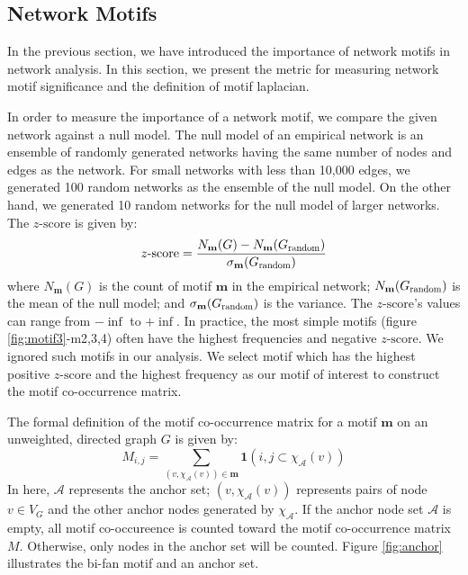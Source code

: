 \documentclass{article}
\theoremstyle{definition}
\begin{document}
\subsection{Network Motifs}

In the previous section, we have introduced the importance of
network motifs in network analysis. In this section, we present
the metric for measuring network motif significance and the definition
of motif laplacian.

In order to measure the importance of a network motif, we compare
the given network against a null model. The null model of an empirical network 
is an ensemble of randomly generated networks having the same number of nodes and
edges as the network. For small networks with less than 10,000 edges, we
generated 100 random networks as the ensemble of the null model. On the other
hand, we generated 10 random networks for the null model of larger networks.
The $z\mbox{-score}$ is given by:
\begin{equation*}
z\mbox{-score} = \frac{N_\mathbf{m}(G)-N_\mathbf{m}(G_{\scalebox{0.75}{random}})}{\sigma_\mathbf{m}(G_{\scalebox{0.75}{random}})}
\end{equation*}
where $N_\mathbf{m}(G)$ is the count of motif $\mathbf{m}$ in the empirical
network; $N_\mathbf{m}(G_{\scalebox{0.75}{random}})$ is the mean of the
null model; and $\sigma_\mathbf{m}(G_{\scalebox{0.75}{random}})$ is the variance.
The $z\mbox{-score}$'s values can range from $-\inf$ to $+\inf$. In practice,
the most simple motifs (figure \ref{fig:motif3}-m2,3,4) often have the highest
frequencies and negative $z\mbox{-score}$. We ignored such motifs in our analysis.
We select motif which has the highest positive $z\mbox{-score}$ and the highest frequency
as our motif of interest to construct the motif co-occurrence matrix.

The formal definition of the motif co-occurrence matrix for a
motif $\mathbf{m}$ on an unweighted, directed graph $G$ is given by:
$$M_{i,j} = \sum_{(v, \chi_{\mathcal{A}}(v)) \in \mathbf{m}} \mathbf{1}({i,j} \subset \chi_\mathcal{A}(v))$$
In here, $\mathcal{A}$ represents the anchor set; $(v, \chi_{\mathcal{A}}(v))$ 
represents pairs of node $v \in V_G$ and the other anchor nodes generated by $\chi_\mathcal{A}$.
If the anchor node set $\mathcal{A}$ is empty, all motif co-occureence is
counted toward the motif co-occurrence matrix $M$. Otherwise, only nodes in
the anchor set will be counted. Figure \ref{fig:anchor} illustrates
the bi-fan motif and an anchor set.
\end{document}
